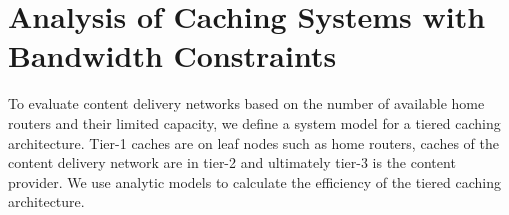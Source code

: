 \section{Analysis of Caching Systems with Bandwidth Constraints}\label{sec:hierarchical:analyticbw:model}

To evaluate content delivery networks based on the number of available home routers and their limited capacity, we define a system model for a tiered caching architecture.
Tier-1 caches are on leaf nodes such as home routers, caches of the content delivery network are in tier-2 and ultimately tier-3 is the content provider.
We use analytic models to calculate the efficiency of the tiered caching architecture.






